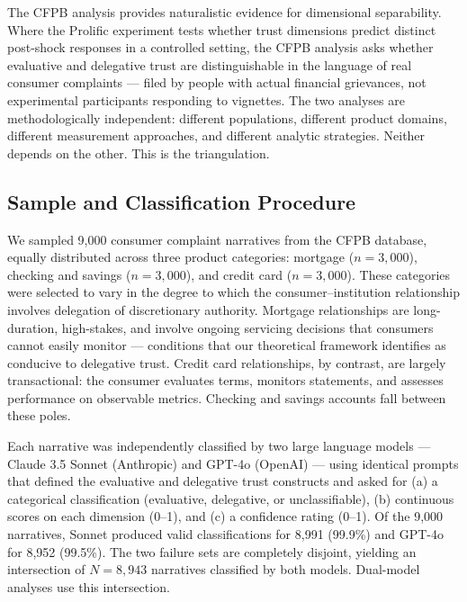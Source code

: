 
The CFPB analysis provides naturalistic evidence for dimensional separability. Where the Prolific experiment tests whether trust dimensions predict distinct post-shock responses in a controlled setting, the CFPB analysis asks whether evaluative and delegative trust are distinguishable in the language of real consumer complaints --- filed by people with actual financial grievances, not experimental participants responding to vignettes. The two analyses are methodologically independent: different populations, different product domains, different measurement approaches, and different analytic strategies. Neither depends on the other. This is the triangulation.

\subsection{Sample and Classification Procedure}

We sampled 9,000 consumer complaint narratives from the CFPB database, equally distributed across three product categories: mortgage ($n = 3{,}000$), checking and savings ($n = 3{,}000$), and credit card ($n = 3{,}000$). These categories were selected to vary in the degree to which the consumer--institution relationship involves delegation of discretionary authority. Mortgage relationships are long-duration, high-stakes, and involve ongoing servicing decisions that consumers cannot easily monitor --- conditions that our theoretical framework identifies as conducive to delegative trust. Credit card relationships, by contrast, are largely transactional: the consumer evaluates terms, monitors statements, and assesses performance on observable metrics. Checking and savings accounts fall between these poles.

Each narrative was independently classified by two large language models --- Claude 3.5 Sonnet (Anthropic) and GPT-4o (OpenAI) --- using identical prompts that defined the evaluative and delegative trust constructs and asked for (a) a categorical classification (evaluative, delegative, or unclassifiable), (b) continuous scores on each dimension (0--1), and (c) a confidence rating (0--1). Of the 9,000 narratives, Sonnet produced valid classifications for 8,991 (99.9\%) and GPT-4o for 8,952 (99.5\%). The two failure sets are completely disjoint, yielding an intersection of $N = 8{,}943$ narratives classified by both models. Dual-model analyses use this intersection.

